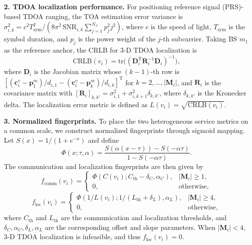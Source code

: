 \documentclass[lettersize,journal]{IEEEtran}
\begin{document}
\noindent\textbf{2. TDOA localization performance.}
For positioning reference signal (PRS)-based TDOA ranging, the TOA estimation error variance is $\sigma_{i,k}^2=c^2T_{\mathrm{sym}}^2/(8\pi^2\,\mathrm{SNR}_{i,k}\sum_{j=1}^{N_J}p_j^2j^2)$, where $c$ is the speed of light, $T_{\mathrm{sym}}$ is the symbol duration, and $p_j$ is the power weight of the $j$-th subcarrier. Taking BS $m_1$ as the reference anchor, the CRLB for 3-D TDOA localization is~\cite{ref16}
\begin{equation}
\mathrm{CRLB}(v_i)=\mathrm{tr}\big((\mathbf{D}_i^{\mathrm{T}}\mathbf{R}_i^{-1}\mathbf{D}_i)^{-1}\big),
\end{equation}
where $\mathbf{D}_i$ is the Jacobian matrix whose $(k-1)$-th row is $[(\mathbf{c}_i^v-\mathbf{p}_1^m)/d_{i,1}-(\mathbf{c}_i^v-\mathbf{p}_k^m)/d_{i,k}]^{\mathrm{T}}$ for $k=2,\ldots,|\mathbf{M}_i|$, and $\mathbf{R}_i$ is the covariance matrix with $[\mathbf{R}_i]_{k,k'}=\sigma_{i,1}^2+\sigma_{i,k+1}^2\delta_{k,k'}$, where $\delta_{k,k'}$ is the Kronecker delta. The localization error metric is defined as $L(v_i)=\sqrt{\mathrm{CRLB}(v_i)}$.

\noindent\textbf{3. Normalized fingerprints.}
To place the two heterogeneous service metrics on a common scale, we construct normalized fingerprints through sigmoid mapping. Let $S(x)=1/(1+e^{-x})$ and define
\begin{equation}
\Phi(x;\tau,\alpha)=\frac{S(\alpha(x-\tau))-S(-\alpha\tau)}{1-S(-\alpha\tau)}.
\end{equation}
The communication and localization fingerprints are then given by
\begin{equation}
f_{\mathrm{comm}}(v_i)=
\begin{cases}
\Phi(C(v_i);C_{\mathrm{th}}-\delta_C,\alpha_C), & |\mathbf{M}_i|\ge 1,\\
0, & \mathrm{otherwise},
\end{cases}
\end{equation}
\begin{equation}
f_{\mathrm{loc}}(v_i)=
\begin{cases}
\Phi(1/L(v_i);1/(L_{\mathrm{th}}+\delta_L),\alpha_L), & |\mathbf{M}_i|\ge 4,\\
0, & \mathrm{otherwise},
\end{cases}
\end{equation}
where $C_{\mathrm{th}}$ and $L_{\mathrm{th}}$ are the communication and localization thresholds, and $\delta_C,\alpha_C,\delta_L,\alpha_L$ are the corresponding offset and slope parameters. When $|\mathbf{M}_i|<4$, 3-D TDOA localization is infeasible, and thus $f_{\mathrm{loc}}(v_i)=0$.
\end{document}
